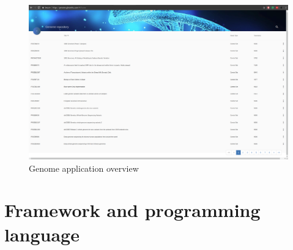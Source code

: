 \documentclass[a4paper,12pt]{article}
\begin{document}
\begin{figure}[H]
\centering
\includegraphics[width=1\textwidth]{images/genome-overview}
\caption{Genome application overview}
\end{figure}

\section{Framework and programming language}
\end{document}
